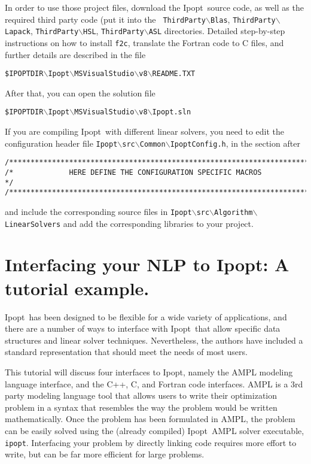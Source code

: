 \documentclass[10pt]{article}
\newcommand{\Ipopt}{{\sc Ipopt}}
\begin{document}
In order to use those project files, download the \Ipopt\ source code,
as well as the required third party code (put it into the {\tt
  ThirdParty$\backslash$Blas}, {\tt ThirdParty$\backslash$Lapack},
{\tt ThirdParty$\backslash$HSL}, {\tt  ThirdParty$\backslash$ASL}
directories.  Detailed step-by-step instructions on how to install
{\tt f2c}, translate the Fortran code to C files, and further details
are described in the file

\texttt{\$IPOPTDIR$\backslash$Ipopt$\backslash$MSVisualStudio$\backslash$v8$\backslash$README.TXT}

After that, you can open the solution file

\texttt{\$IPOPTDIR$\backslash$Ipopt$\backslash$MSVisualStudio$\backslash$v8$\backslash$Ipopt.sln}

If you are compiling \Ipopt\ with different linear solvers, you need
to edit the configuration header file
\texttt{Ipopt$\backslash$src$\backslash$Common$\backslash$IpoptConfig.h},
in the section after
\begin{verbatim}
/***************************************************************************/
/*             HERE DEFINE THE CONFIGURATION SPECIFIC MACROS               */
/***************************************************************************/
\end{verbatim}
and include the corresponding source files in
\texttt{Ipopt$\backslash$src$\backslash$Algorithm$\backslash$LinearSolvers}
and add the corresponding libraries to your project.

\section{Interfacing your NLP to \Ipopt: A tutorial example.}
\label{sec:tutorial-example}

\Ipopt\ has been designed to be flexible for a wide variety of
applications, and there are a number of ways to interface with \Ipopt\
that allow specific data structures and linear solver
techniques. Nevertheless, the authors have included a standard
representation that should meet the needs of most users.

This tutorial will discuss four interfaces to \Ipopt, namely the AMPL
modeling language\cite{FouGayKer:AMPLbook} interface, and the C++, C,
and Fortran code interfaces.  AMPL is a 3rd party modeling language
tool that allows users to write their optimization problem in a syntax
that resembles the way the problem would be written mathematically.
Once the problem has been formulated in AMPL, the problem can be
easily solved using the (already compiled) \Ipopt\ AMPL solver
executable, {\tt ipopt}. Interfacing your problem by directly linking
code requires more effort to write, but can be far more efficient for
large problems.
\end{document}
